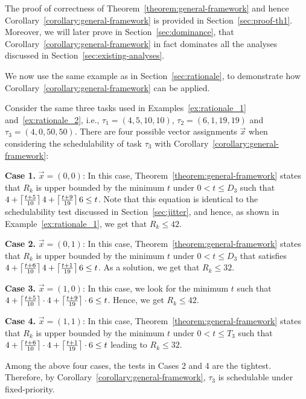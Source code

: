  The proof of correctness of Theorem~\ref{theorem:general-framework} and hence Corollary~\ref{corollary:general-framework} is provided in Section~\ref{sec:proof-th1}. Moreover, we will later prove in Section~\ref{sec:dominance}, that Corollary~\ref{corollary:general-framework} in fact dominates all the analyses discussed in Section~\ref{sec:existing-analyses}.
 
 We now use the same example as in Section~\ref{sec:rationale}, to demonstrate how
Corollary~\ref{corollary:general-framework} can be applied.
 
 \begin{example}
 \label{ex:general_framework}
  Consider the same three tasks used in Examples~\ref{ex:rationale_1} and~\ref{ex:rationale_2}, i.e., $\tau_1 = (4, 5, 10, 10)$, $\tau_2 =(6, 1, 19, 19)$ and $\tau_3 = (4, 0, 50, 50)$. There are four possible vector assignments $\vec{x}$ when considering the schedulability of task $\tau_3$ with Corollary~\ref{corollary:general-framework}:

\noindent\textbf{Case 1.} $\vec{x} = (0 , 0)$: In this case, Theorem~\ref{theorem:general-framework} states that $R_k$ is upper bounded by the minimum $t$ under $0 < t \leq D_3$ such that $4+ \left\lceil{\frac{t+5}{10}}\right\rceil 4 + \left\lceil{\frac{t+9}{19}}\right\rceil 6 \leq t$. Note that this equation is identical to the schedulability test discussed in Section~\ref{sec:jitter}, and hence, as shown in Example~\ref{ex:rationale_1}, we get that $R_k \leq 42$.

\noindent\textbf{Case 2.} $\vec{x} = (0 , 1)$:
 In this case, Theorem~\ref{theorem:general-framework} states that $R_k$ is upper bounded by  the minimum $t$
under $0 < t \leq D_3$ that satisfies $4+ \left\lceil{\frac{t+6}{10}}\right\rceil 4 + \left\lceil{\frac{t+1}{19}}\right\rceil 6 \leq t$. As a solution, we get that $R_k \leq 32$. %
       
\noindent\textbf{Case 3.} $\vec{x} = (1 , 0)$:
 In this case, we look for the minimum $t$ such that $4+ \left\lceil{\frac{t+5}{10}}\right\rceil\cdot 4 + \left\lceil{\frac{t+9}{19}}\right\rceil\cdot 6 \leq t$. Hence, we get $R_k \leq 42$.

\noindent\textbf{Case 4.} $\vec{x} = (1 , 1)$:
 In this case, Theorem~\ref{theorem:general-framework} states that $R_k$ is upper bounded by  the minimum $t$
under $0 < t \leq T_3$ such that $
       4+ \left\lceil{\frac{t+6}{10}}\right\rceil\cdot 4 + \left\lceil{\frac{t+1}{19}}\right\rceil\cdot 6 \leq t$ leading to $R_k \leq 32$.%

Among the above four cases, the tests in Cases 2 and 4 are the tightest. Therefore, by
Corollary~\ref{corollary:general-framework}, $\tau_3$ is
schedulable under fixed-priority.
\hfill\myendproof
 \end{example}

